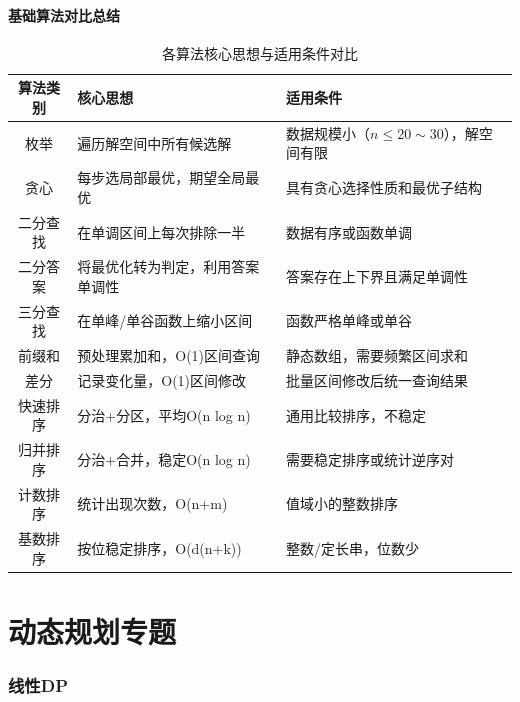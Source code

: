 \documentclass[12pt,a4paper]{ctexart}
\begin{document}
	\subsection*{基础算法对比总结}
	\begin{table}[h]
		\centering
		\caption{各算法核心思想与适用条件对比}
		\begin{tabularx}{\textwidth}{cXX}
			\toprule
			\textbf{算法类别} & \textbf{核心思想} & \textbf{适用条件} \\
			\midrule
			枚举 & 遍历解空间中所有候选解 & 数据规模小（\(n\le 20\sim30\)），解空间有限 \\
			\midrule
			贪心 & 每步选局部最优，期望全局最优 & 具有贪心选择性质和最优子结构 \\
			\midrule
			二分查找 & 在单调区间上每次排除一半 & 数据有序或函数单调 \\
			\midrule
			二分答案 & 将最优化转为判定，利用答案单调性 & 答案存在上下界且满足单调性 \\
			\midrule
			三分查找 & 在单峰/单谷函数上缩小区间 & 函数严格单峰或单谷 \\
			\midrule
			前缀和 & 预处理累加和，O(1)区间查询 & 静态数组，需要频繁区间求和 \\
			\midrule
			差分 & 记录变化量，O(1)区间修改 & 批量区间修改后统一查询结果 \\
			\midrule
			快速排序 & 分治+分区，平均O(n log n) & 通用比较排序，不稳定 \\
			\midrule
			归并排序 & 分治+合并，稳定O(n log n) & 需要稳定排序或统计逆序对 \\
			\midrule
			计数排序 & 统计出现次数，O(n+m) & 值域小的整数排序 \\
			\midrule
			基数排序 & 按位稳定排序，O(d(n+k)) & 整数/定长串，位数少 \\
			\bottomrule
		\end{tabularx}
	\end{table}
	
	\newpage
	
	\part{动态规划专题}
	
	\section{线性DP}
	
\end{document}
